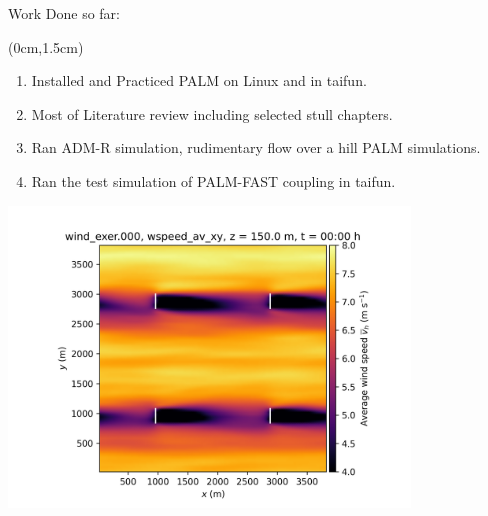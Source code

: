 \documentclass[aspectratio=1610]{beamer}
\begin{document}
\begin{frame}{Work Done so far:}
\begin{textblock*}{\textwidth}(0cm,1.5cm)
    \begin{minipage}{0.48\textwidth}
        \begin{enumerate}
        \small
            \item Installed and Practiced PALM on Linux and in taifun.
            \item Most of Literature review including selected stull chapters.
            \item Ran ADM-R simulation, rudimentary flow over a hill PALM simulations.
            \item Ran the test simulation of PALM-FAST coupling in taifun.
        \end{enumerate}
    \end{minipage}
    \hfill
    \begin{minipage}{0.48\textwidth}
        \centering
        \includegraphics[width=0.8\textwidth]{adr.png}
    \end{minipage}
\end{textblock*}


\end{frame}
\end{document}
